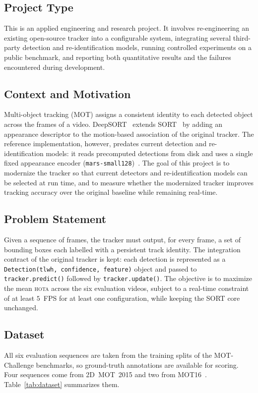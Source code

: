 \documentclass[12pt, a4paper]{article}
\newcommand{\hota}{\textsc{hota}}
\begin{document}
\subsection{Project Type}
This is an applied engineering and research project. It involves re-engineering an existing
open-source tracker into a configurable system, integrating several third-party detection and
re-identification models, running controlled experiments on a public benchmark, and reporting both
quantitative results and the failures encountered during development.

\subsection{Context and Motivation}
Multi-object tracking (MOT) assigns a consistent identity to each detected object across the frames
of a video. DeepSORT~\cite{wojke2017deepsort} extends SORT~\cite{bewley2016sort} by adding an
appearance descriptor to the motion-based association of the original tracker. The reference
implementation, however, predates current detection and re-identification models: it reads
precomputed detections from disk and uses a single fixed appearance encoder
(\texttt{mars-small128})~\cite{wojke2018cosine}. The goal of this project is to modernize the tracker
so that current detectors and re-identification models can be selected at run time, and to measure
whether the modernized tracker improves tracking accuracy over the original baseline while remaining
real-time.

\subsection{Problem Statement}
Given a sequence of frames, the tracker must output, for every frame, a set of bounding boxes each
labelled with a persistent track identity. The integration contract of the original tracker is kept:
each detection is represented as a \texttt{Detection(tlwh, confidence, feature)} object and passed to
\texttt{tracker.predict()} followed by \texttt{tracker.update()}. The objective is to maximize the
mean \hota{} across the six evaluation videos, subject to a real-time constraint of at least
$5$~FPS for at least one configuration, while keeping the SORT core unchanged.

\subsection{Dataset}
\label{sec:dataset}
All six evaluation sequences are taken from the training splits of the MOT-Challenge benchmarks, so
ground-truth annotations are available for scoring. Four sequences come from 2D~MOT~2015
\cite{leal2015motchallenge} and two from MOT16~\cite{milan2016mot16}. Table~\ref{tab:dataset}
summarizes them.
\end{document}
